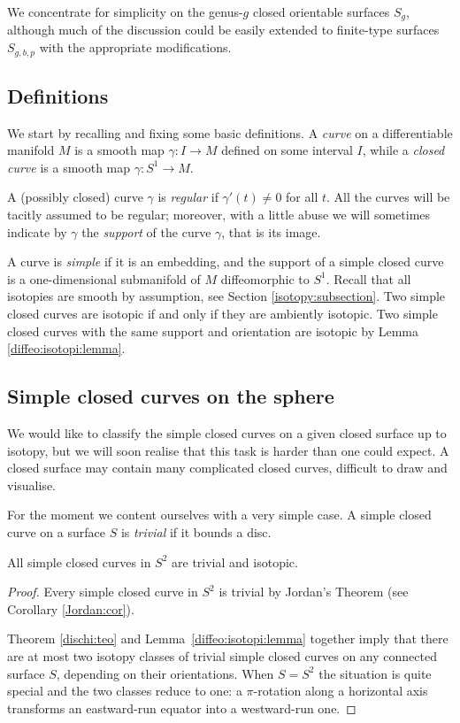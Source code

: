 We concentrate for simplicity on the genus-$g$ closed orientable surfaces $S_g$, although much of the discussion could be easily extended to finite-type surfaces $S_{g,b,p}$ with the appropriate modifications. 

\subsection{Definitions}
We start by recalling and fixing some basic definitions.
A \emph{curve} on a differentiable manifold $M$ is a smooth map $\gamma \colon I\to M$ defined on some interval $I$, while a \emph{closed curve} is a smooth map $\gamma\colon S^1\to M$. 

A (possibly closed) curve $\gamma$ is \emph{regular} if $\gamma'(t)\neq 0$ for all $t$. All the curves will be tacitly assumed to be regular; moreover, with a little abuse we will sometimes indicate by $\gamma$ the \emph{support} of the curve $\gamma$, that is its image.

A curve is \emph{simple} if it is an embedding, and the support of a simple closed curve is a one-dimensional submanifold of $M$ diffeomorphic to $S^1$. Recall that all isotopies are smooth by assumption, see Section \ref{isotopy:subsection}. Two simple closed curves are isotopic if and only if they are ambiently isotopic. Two simple closed curves with the same support and orientation are isotopic by Lemma \ref{diffeo:isotopi:lemma}. 

\subsection{Simple closed curves on the sphere}
We would like to classify the simple closed curves on a given closed surface up to isotopy, but we will soon realise that this task is harder than one could expect. A closed surface may contain many complicated closed curves, difficult to draw and visualise.

For the moment we content ourselves with a very simple case. A simple closed curve on a surface $S$ is \emph{trivial} if it bounds a disc.

\begin{prop}
All simple closed curves in $S^2$ are trivial and isotopic.
\end{prop}
\begin{proof}
Every simple closed curve in $S^2$ is trivial by Jordan's Theorem (see Corollary \ref{Jordan:cor}). 

Theorem \ref{dischi:teo} and Lemma~\ref{diffeo:isotopi:lemma} together imply that there are at most two isotopy classes of trivial simple closed curves on any connected surface $S$, depending on their orientations. When $S=S^2$ the situation is quite special and the two classes reduce to one: a $\pi$-rotation along a horizontal axis transforms an eastward-run equator into a westward-run one.
\end{proof}

